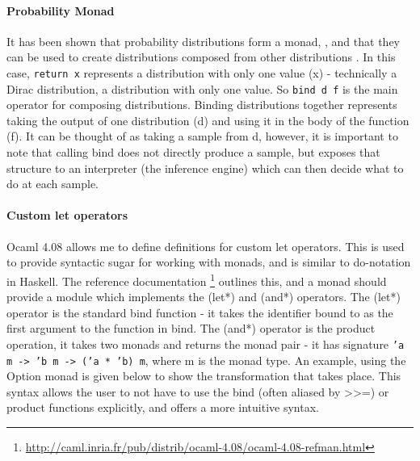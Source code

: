 \paragraph{Probability Monad}
It has been shown that probability distributions form a monad, \cite{giry1982categorical, jones1989probabilistic}, and that they can be used to create distributions composed from other distributions \cite{ramsey2002stochastic}. In this case, \texttt{return x} represents a distribution with only one value (x) - technically a Dirac distribution, a distribution with only one value. So \texttt{bind d f} is the main operator for composing distributions. Binding distributions together represents taking the output of one distribution (d) and using it in the body of the function (f). It can be thought of as taking a sample from d, however, it is important to note that calling bind does not directly produce a sample, but exposes that structure to an interpreter (the inference engine) which can then decide what to do at each sample.
	
	
\paragraph{Custom let operators}
Ocaml 4.08 allows me to define definitions for custom let operators. This is used to provide syntactic sugar for working with monads, and is similar to do-notation in Haskell. The reference documentation \footnote{\url{http://caml.inria.fr/pub/distrib/ocaml-4.08/ocaml-4.08-refman.html}} outlines this, and a monad should provide a module which implements the (let*) and (and*) operators. The (let*) operator is the standard bind function - it takes the identifier bound to as the first argument to the function in bind. The (and*) operator is the product operation, it takes two monads and returns the monad pair - it has signature \texttt{'a m -> 'b m -> ('a * 'b) m}, where m is the monad type. An example, using the Option monad is given below to show the transformation that takes place. This syntax allows the user to not have to use the bind (often aliased by >>=) or product functions explicitly, and offers a more intuitive syntax.
	
